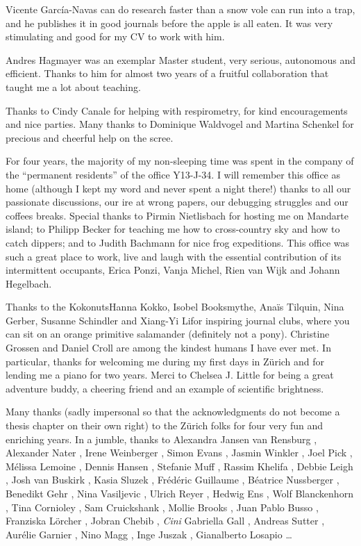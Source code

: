 Vicente Garc\'ia-Navas can do research faster than a snow vole can run into a trap, and he publishes it in good journals before the apple is all eaten. It was very stimulating and good for my CV to work with him. 

Andres Hagmayer was an exemplar Master student, very serious, autonomous and efficient. Thanks to him for almost two years of a fruitful collaboration that taught me a lot about teaching. 

Thanks to Cindy Canale for helping with respirometry, for kind encouragements and nice parties. 
Many thanks to Dominique Waldvogel and Martina Schenkel for precious and cheerful help on the scree. 


For four years, the majority of my non-sleeping time was spent in the company of the ``permanent residents'' of the office Y13-J-34. I will remember this office as home (although I kept my word and never spent a night there!) thanks to all our passionate discussions, our ire at wrong papers, our debugging struggles and our coffees breaks. Special thanks to Pirmin Nietlisbach for hosting me on Mandarte island; to Philipp Becker for teaching me how to cross-country sky and how to catch dippers; and to Judith Bachmann for nice frog expeditions. 
This office was such a great place to work, live and laugh with the essential contribution of its intermittent occupants,
Erica Ponzi, 
Vanja Michel, 
Rien van Wijk and 
Johann Hegelbach.


Thanks to the Kokonuts\textemdash Hanna Kokko, Isobel Booksmythe, Ana\"is Tilquin, Nina Gerber, Susanne Schindler and Xiang-Yi Li\textemdash for inspiring journal clubs, where you can sit on an orange primitive salamander (definitely not a pony).
Christine Grossen and Daniel Croll are among the kindest humans I have ever met. In particular, thanks for welcoming me during my first days in Z\"urich and for lending me a piano for two years.
Merci to Chelsea J. Little for being a great adventure buddy, a cheering friend and an example of scientific brightness. 

Many thanks (sadly impersonal so that the acknowledgments do not become a thesis chapter on their own right) to the Z\"urich folks for four very fun and enriching years. In a jumble, thanks to 
Alexandra Jansen van Rensburg 
, Alexander Nater
, Irene Weinberger
, Simon Evans
, Jasmin Winkler
, Joel Pick
, M\'elissa Lemoine
, Dennis Hansen
, Stefanie Muff
, Rassim Khelifa
, Debbie Leigh
, Josh van Buskirk 
, Kasia Sluzek
, Fr\'ed\'eric Guillaume
, Béatrice Nussberger
, Benedikt Gehr	
, Nina Vasiljevic
, Ulrich Reyer
, Hedwig Ens
, Wolf Blanckenhorn
, Tina Cornioley
, Sam Cruickshank
, Mollie Brooks
, Juan Pablo Busso
, Franziska L\"orcher
, Jobran Chebib
, \emph{Cini} Gabriella Gall
, Andreas Sutter
, Aur\'elie Garnier
, Nino Magg
, Inge Juszak
, Gianalberto Losapio
\dots

